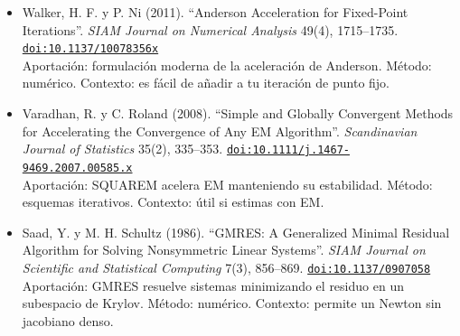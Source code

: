 \documentclass[11pt]{article}
\begin{document}
\begin{itemize}
\item Walker, H. F. y P. Ni (2011). ``Anderson Acceleration for Fixed-Point Iterations''. \textit{SIAM Journal on Numerical Analysis} 49(4), 1715--1735. \href{https://doi.org/10.1137/10078356x}{\texttt{doi:10.1137/10078356x}}\\
Aportación: formulación moderna de la aceleración de Anderson. Método: numérico. Contexto: es fácil de añadir a tu iteración de punto fijo.
\item Varadhan, R. y C. Roland (2008). ``Simple and Globally Convergent Methods for Accelerating the Convergence of Any EM Algorithm''. \textit{Scandinavian Journal of Statistics} 35(2), 335--353. \href{https://doi.org/10.1111/j.1467-9469.2007.00585.x}{\texttt{doi:10.1111/j.1467-9469.2007.00585.x}}\\
Aportación: SQUAREM acelera EM manteniendo su estabilidad. Método: esquemas iterativos. Contexto: útil si estimas con EM.
\item Saad, Y. y M. H. Schultz (1986). ``GMRES: A Generalized Minimal Residual Algorithm for Solving Nonsymmetric Linear Systems''. \textit{SIAM Journal on Scientific and Statistical Computing} 7(3), 856--869. \href{https://doi.org/10.1137/0907058}{\texttt{doi:10.1137/0907058}}\\
Aportación: GMRES resuelve sistemas minimizando el residuo en un subespacio de Krylov. Método: numérico. Contexto: permite un Newton sin jacobiano denso.
\end{itemize}
\end{document}
